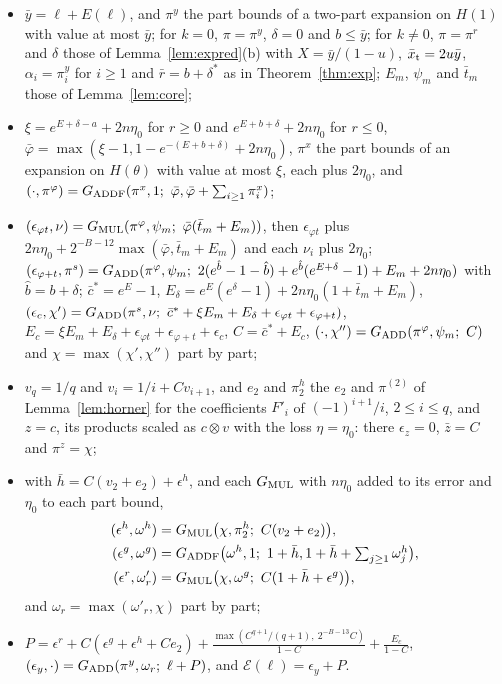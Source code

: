 \begin{itemize}
\item $\bar y = \ell + E(\ell)$, and $\pi^y$ the part bounds of a two-part expansion on $H(1)$ with value at most $\bar
  y$; for $k = 0$, $\pi = \pi^y$, $\delta = 0$ and $b \le \bar y$; for $k \ne 0$, $\pi = \pi^r$ and $\delta$ those of
  Lemma~\ref{lem:expred}(b) with $X = \bar y/(1-u)$, $\bar x_{\rm t} = 2u\bar y$, $\alpha_i = \pi^y_i$ for $i \ge 1$ and
  $\bar r = b + \delta^*$ as in Theorem~\ref{thm:exp}; $E_m$, $\psi_m$ and $\bar t_m$ those of Lemma~\ref{lem:core};
\item $\xi = e^{E + \delta - a} + 2n\eta_0$ for $r \ge 0$ and $e^{E + b + \delta} + 2n\eta_0$ for $r \le 0$,
  $\bar \varphi = \max(\xi - 1, 1 - e^{-(E + b + \delta)} + 2n\eta_0)$, $\pi^x$ the part bounds of an expansion on $H(\theta)$
  with value at most $\xi$, each plus $2\eta_0$, and $(\cdot, \pi^\varphi) = G_{\rm ADDF}(\pi^x, 1;\ \bar \varphi, \bar \varphi + \sum_{i
  \ge 1}\pi^x_i)$;
\item $(\epsilon_{\varphi t}, \nu) = G_{\rm MUL}(\pi^\varphi, \psi_m;\ \bar \varphi(\bar t_m + E_m))$, then $\epsilon_{\varphi t}$ plus $2n\eta_0 +
  2^{-B-12}\max(\bar \varphi, \bar t_m + E_m)$ and each $\nu_i$ plus $2\eta_0$; $(\epsilon_{\varphi+t}, \pi^s) = G_{\rm ADD}(\pi^\varphi,
  \psi_m;\ 2(e^{\hat b} - 1 - \hat b) + e^{\hat b}(e^{E + \delta} - 1) + E_m + 2n\eta_0)$ with $\hat b = b + \delta$;
  $\bar c^* = e^E - 1$, $E_\delta = e^E(e^\delta - 1) + 2n\eta_0(1 + \bar t_m + E_m)$, $(\epsilon_c, \chi') = G_{\rm
  ADD}(\pi^s, \nu;\ \bar c^* + \xi E_m + E_\delta + \epsilon_{\varphi t} + \epsilon_{\varphi+t})$, $E_c = \xi E_m + E_\delta +
  \epsilon_{\varphi t} + \epsilon_{\varphi+t} + \epsilon_c$, $C = \bar c^* + E_c$, $(\cdot, \chi'') = G_{\rm ADD}(\pi^\varphi, \psi_m;\
  C)$ and $\chi = \max(\chi', \chi'')$ part by part;
\item $v_q = 1/q$ and $v_i = 1/i + Cv_{i+1}$, and $e_2$ and $\pi^h_2$ the $e_2$ and $\pi^{(2)}$ of
  Lemma~\ref{lem:horner} for the coefficients $F'_i$ of $(-1)^{i+1}/i$, $2 \le i \le q$, and $z = c$, its products
  scaled as $c \otimes v$ with the loss $\eta = \eta_0$: there $\epsilon_z = 0$, $\bar z = C$ and $\pi^z = \chi$;
\item with $\bar h = C(v_2 + e_2) + \epsilon^h$, and each $G_{\rm MUL}$ with $n\eta_0$ added to its error and $\eta_0$
  to each part bound,
  \begin{align*}
  (\epsilon^h, \omega^h) &= G_{\rm MUL}\bigl(\chi, \pi^h_2;\ C(v_2 + e_2)\bigr), \\
  (\epsilon^g, \omega^g) &= G_{\rm ADDF}\bigl(\omega^h, 1;\ 1 + \bar h, 1 + \bar h + \textstyle\sum_{j \ge
  1}\omega^h_j\bigr), \\
    (\epsilon^r, \omega'_r) &= G_{\rm MUL}\bigl(\chi, \omega^g;\ C(1 + \bar h + \epsilon^g)\bigr),
  \end{align*}
  and $\omega_r = \max(\omega'_r, \chi)$ part by part;
\item $P = \epsilon^r + C(\epsilon^g + \epsilon^h + Ce_2) + \frac{\max(C^{q+1}/(q+1),\ 2^{-B-13}C)}{1-C} +
  \frac{E_c}{1-C}$, $(\epsilon_y, \cdot) = G_{\rm ADD}(\pi^y, \omega_r;\ \ell + P)$, and $\mathcal E(\ell) = \epsilon_y
  + P$.
\end{itemize}

